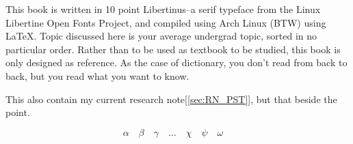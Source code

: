 \documentclass[../../main.tex]{subfiles}
\begin{document}
This book is written in  10 point Libertinus--a serif typeface from the Linux Libertine Open Fonts Project, and compiled using Arch Linux (BTW) using \LaTeX{}.
Topic discussed here is your average undergrad topic, sorted in no particular order.
Rather than to be used as textbook to be studied, this book is only designed as reference.
As the case of dictionary, you don't read from back to back, but you read what you want to know.

This also contain my current research note[\ref{sec:RN_PST}], but that beside the point.

\vspace*{2em}

\begin{equation*}
  \alpha\quad
  \beta\quad
  \gamma\quad
  \dots\quad
  \chi\quad
  \psi\quad
  \omega\quad
\end{equation*}

\vspace*{\fill}
\end{document}
